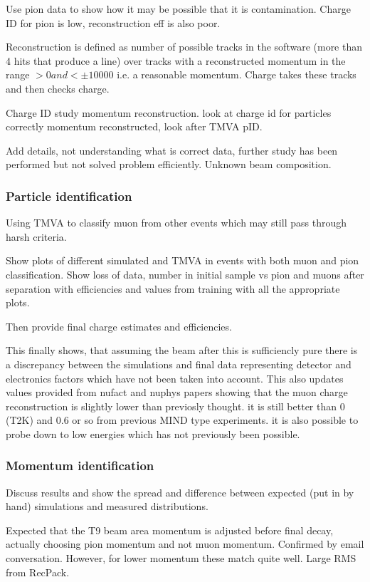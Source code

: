Use pion data to show how it may be possible that it is contamination. Charge ID for pion is low, reconstruction eff is also poor.

Reconstruction is defined as number of possible tracks in the software (more than 4 hits that produce a line) over tracks with a reconstructed momentum in the range $>0 and <\pm 10000$ i.e. a reasonable momentum. Charge takes these tracks and then checks charge.

Charge ID study momentum reconstruction. look at charge id for particles correctly momentum reconstructed, look after TMVA pID. 


Add details, not understanding what is correct data, further study has been performed but not solved problem efficiently. Unknown beam composition.


\subsubsection{Particle identification}

Using TMVA to classify muon from other events which may still pass through harsh criteria. 

Show plots of different simulated and TMVA in events with both muon and pion classification. Show loss of data, number in initial sample vs pion and muons after separation with efficiencies and values from training with all the appropriate plots.

Then provide final charge estimates and efficiencies.

This finally shows, that assuming the beam after this is sufficiencly pure there is a discrepancy between the simulations and final data representing detector and electronics factors which have not been taken into account. This also updates values provided from nufact and nuphys papers showing that the muon charge reconstruction is slightly lower than previosly thought. it is still better than 0 (T2K) and 0.6 or so from previous MIND type experiments. it is also possible to probe down to low energies which has not previously been possible.

\subsubsection{Momentum identification}
Discuss results and show the spread and difference between expected (put in by hand) simulations and measured distributions. 

Expected that the T9 beam area momentum is adjusted before final decay, actually choosing pion momentum and not muon momentum. Confirmed by email conversation. However, for lower momentum these match quite well. Large RMS from RecPack.



